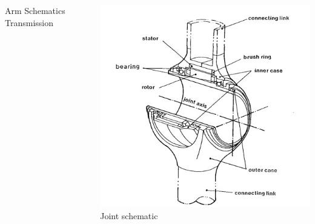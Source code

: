 \begin{frame}
\begin{columns}[t]
\begin{column}{.45\columnwidth}
\begin{minipage}[b]{\textwidth}
			\footnotesize{Arm Schematics Transmission} %
	\end{minipage}
\end{column}
%
\begin{column}{.45\columnwidth}
	\begin{minipage}[b]{\textwidth}
		\includegraphics[width=1.2\textwidth, height=1.2\textwidth]{figures/dd_joints.jpg} \\
		\footnotesize{Joint schematic} %
\end{minipage}
%
\end{column}
\end{columns}
\end{frame}

